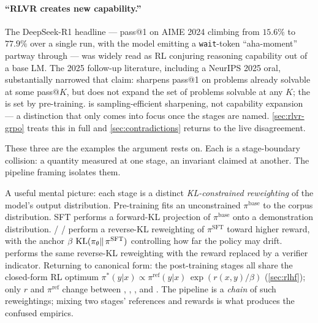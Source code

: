 \paragraph{``RLVR creates new capability.'' } The DeepSeek-R1
\citep{deepseek-r1} headline --- pass@1 on AIME 2024 climbing from
$15.6\%$ to $77.9\%$ over a single  run, with the model emitting a
\texttt{wait}-token ``aha-moment'' partway through --- was widely read
as RL conjuring reasoning capability out of a base LM. The 2025
follow-up literature, including a NeurIPS 2025 oral, substantially
narrowed that claim:  sharpens pass@1 on problems already solvable
at some pass@$K$, but does not expand the set of problems solvable at
any $K$; the  is set by pre-training.  is
sampling-efficient sharpening, not capability expansion --- a
distinction that only comes into focus once the stages are named.
\cref{sec:rlvr-grpo} treats this in full and \cref{sec:contradictions}
returns to the live disagreement.

These three are the examples the argument rests on. Each is a stage-boundary
collision: a quantity measured at one stage, an invariant claimed at
another. The pipeline framing isolates them.

\begin{intuition}
A useful mental picture: each stage is a distinct
\emph{KL-constrained reweighting} of the model's output distribution.
Pre-training fits an unconstrained $\pi^{\mathrm{base}}$ to the corpus
distribution. SFT performs a forward-KL projection of $\pi^{\mathrm{base}}$
onto a demonstration distribution.  /  /  perform a reverse-KL
reweighting of $\pi^{\mathrm{SFT}}$ toward higher reward, with the anchor
$\beta\,\operatorname{KL}(\pi_\theta \|\, \pi^{\mathrm{SFT}})$ controlling how far the
policy may drift.  performs the same reverse-KL reweighting with the
reward replaced by a verifier indicator. Returning to canonical form: the
post-training stages all share the closed-form RL optimum
$\pi^*(y|x) \propto \pi^{\mathrm{ref}}(y|x)\,\exp(r(x,y)/\beta)$
(\cref{sec:rlhf}); only $r$ and $\pi^{\mathrm{ref}}$ change between
, , , and . The pipeline is a \emph{chain} of such
reweightings; mixing two stages' references and rewards is what
produces the confused empirics.
\end{intuition}


